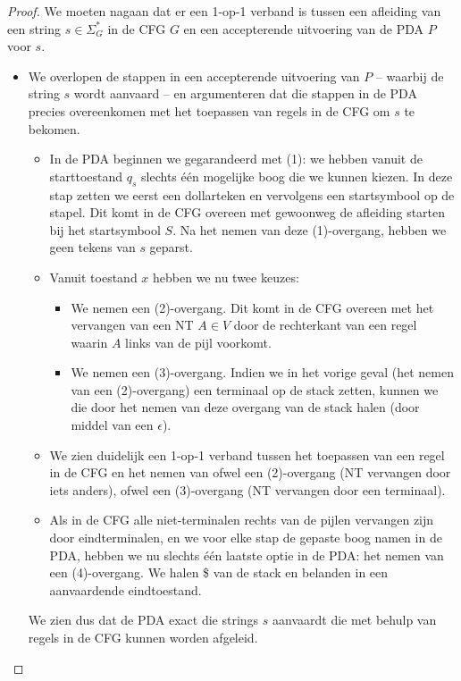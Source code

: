 \documentclass[../aanvullingen_cursus.tex]{subfiles}
\begin{document}
\begin{proof}
	We moeten nagaan dat er een 1-op-1 verband is tussen een afleiding van een string \(s \in \Sigma_G^*\) in de CFG \(G\) en een accepterende uitvoering van de PDA \(P\) voor \(s\).
	\begin{itemize}
		\item We overlopen de stappen in een accepterende uitvoering van \(P\) -- waarbij de string \(s\) wordt aanvaard -- en argumenteren dat die stappen in de PDA precies overeenkomen met het toepassen van regels in de CFG om \(s\) te bekomen.
		\begin{itemize}
			\item In de PDA beginnen we gegarandeerd met (1): we hebben vanuit de starttoestand \(q_s\) slechts één mogelijke boog die we kunnen kiezen. In deze stap zetten we eerst een dollarteken en vervolgens een startsymbool op de stapel. Dit komt in de CFG overeen met gewoonweg de afleiding starten bij het startsymbool \(S\). Na het nemen van deze (1)-overgang, hebben we geen tekens van \(s\) geparst.
			\item Vanuit toestand \(x\) hebben we nu twee keuzes:
			\begin{itemize}
				\item We nemen een (2)-overgang. Dit komt in de CFG overeen met het vervangen van een NT \(A\in V\) door de rechterkant van een regel waarin \(A\) links van de pijl voorkomt.
				\item We nemen een (3)-overgang. Indien we in het vorige geval (het nemen van een (2)-overgang) een terminaal op de stack zetten, kunnen we die door het nemen van deze overgang van de stack halen (door middel van een \(\epsilon\)).
			\end{itemize}
			\item We zien duidelijk een 1-op-1 verband tussen het toepassen van een regel in de CFG en het nemen van ofwel een (2)-overgang (NT vervangen door iets anders), ofwel een (3)-overgang (NT vervangen door een terminaal).
			\item Als in de CFG alle niet-terminalen rechts van de pijlen vervangen zijn door eindterminalen, en we voor elke stap de gepaste boog namen in de PDA, hebben we nu slechts één laatste optie in de PDA: het nemen van een (4)-overgang. We halen \$ van de stack en belanden in een aanvaardende eindtoestand.
		\end{itemize}

		We zien dus dat de PDA exact die strings \(s\) aanvaardt die met behulp van regels in de CFG kunnen worden afgeleid.
	\end{itemize}
\end{proof}
\end{document}

